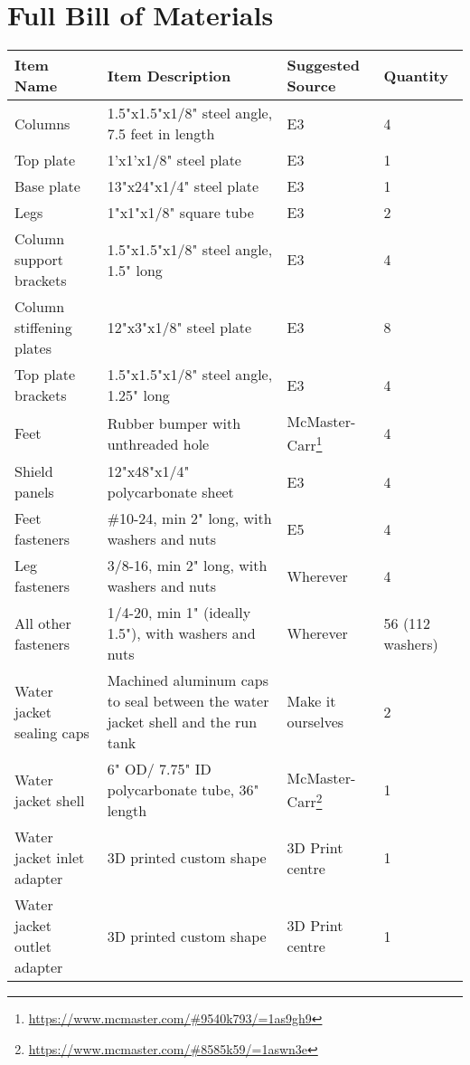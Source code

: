 \documentclass[11pt]{article}
\begin{document}
\section{Full Bill of Materials}
\begin{center}
	\begin{longtabu} to \linewidth { |X[l]|X[2,l]|X[l]|X[0.7,r]| }
		\hline
		\textbf{Item Name} & \textbf{Item Description} & \textbf{Suggested Source} & \textbf{Quantity} \\
		\hline
		Columns & 1.5"x1.5"x1/8" steel angle, 7.5 feet in length & E3 & 4 \\
		\hline
		Top plate & 1'x1'x1/8" steel plate & E3 & 1 \\
		\hline
		Base plate & 13"x24"x1/4" steel plate & E3 & 1 \\
		\hline
		Legs & 1"x1"x1/8" square tube & E3 & 2 \\
		\hline
		Column support brackets & 1.5"x1.5"x1/8" steel angle, 1.5" long & E3 & 4 \\
		\hline
		Column stiffening plates & 12"x3"x1/8" steel plate & E3 & 8 \\
		\hline
		Top plate brackets & 1.5"x1.5"x1/8" steel angle, 1.25" long & E3 & 4 \\
		\hline
		Feet & Rubber bumper with unthreaded hole & McMaster-Carr\footnote{\url{https://www.mcmaster.com/\#9540k793/=1as9gh9}} & 4 \\
		\hline
		Shield panels & 12"x48"x1/4" polycarbonate sheet & E3 & 4\\
		\hline
		Feet fasteners & \#10-24, min 2" long, with washers and nuts	 & E5 & 4 \\
		\hline
		Leg fasteners & 3/8-16, min 2" long, with washers and nuts & Wherever & 4 \\
		\hline
		All other fasteners & 1/4-20, min 1" (ideally 1.5"), with washers and nuts & Wherever & 56 (112 washers) \\
		\hline
		Water jacket sealing caps & Machined aluminum caps to seal between the water jacket shell and the run tank & Make it ourselves & 2 \\
		\hline
		Water jacket shell & 6" OD/ 7.75" ID polycarbonate tube, 36" length & McMaster-Carr\footnote{\url{https://www.mcmaster.com/\#8585k59/=1aswn3e}} & 1 \\
		\hline
		Water jacket inlet adapter & 3D printed custom shape & 3D Print centre & 1 \\
		\hline
		Water jacket outlet adapter & 3D printed custom shape & 3D Print centre & 1 \\

\end{longtabu}
\end{center}
\end{document}
